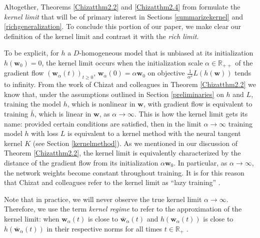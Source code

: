 \documentclass{article}
\begin{document}
Altogether, Theorems \ref{Chizatthm2.2} and \ref{Chizatthm2.4} from \cite{chizat2018lazy} formulate the \textit{kernel limit} that will be of primary interest in Sections \ref{summarizekernel} and \ref{richgeneralization}. To conclude this portion of our paper, we make clear our definition of the kernel limit and contrast it with the \textit{rich limit}. 

To be explicit, for $h$ a $D$-homogeneous model that is unbiased at its initialization $h(\boldsymbol{w}_0) = 0$, the kernel limit occurs when the initialization scale $\alpha \in \mathbb{R}_{++}$ of the gradient flow $(\boldsymbol{w}_{\alpha}(t))_{t \geq 0}$, $\boldsymbol{w}_{\alpha}(0) = \alpha \boldsymbol{w}_0$ on objective $\frac{1}{\alpha^2}L(h(\boldsymbol{w}))$ tends to infinity. From the work of Chizat and colleagues in Theorem \ref{Chizatthm2.2} we know that, under the assumptions outlined in Section \ref{preliminaries} on $h$ and $L$, training the  model $h$, which is nonlinear in $\boldsymbol{w}$, with gradient flow is equivalent to training $\bar{h}$, which is linear in $\boldsymbol{w}$, as $\alpha \rightarrow \infty$. This is how the kernel limit gets its name: provided certain conditions are satisfied, then in the limit $\alpha \rightarrow \infty$ training model $h$ with loss $L$ is equivalent to a kernel method with the neural tangent kernel $K$ (see Section \ref{kernelmethod}). As we mentioned in our discussion of Theorem \ref{Chizatthm2.2}, the kernel limit is equivalently characterized by the distance of the gradient flow from its initialization $\alpha \boldsymbol{w}_0$. In particular, as $\alpha \rightarrow \infty$, the network weights become constant throughout training. It is for this reason that Chizat and colleagues refer to the kernel limit as \enquote{lazy training} \cite{chizat2018lazy}. 

Note that in practice, we will never observe the true kernel limit $\alpha \rightarrow \infty$. Therefore, we use the term \textit{kernel regime} to refer to the approximation of the kernel limit: when $\boldsymbol{w}_{\alpha}(t)$ is close to $\boldsymbol{\bar{w}}_{\alpha}(t)$ and $h(\boldsymbol{w}_{\alpha}(t))$ is close to $h(\boldsymbol{\bar{w}}_{\alpha}(t))$ in their respective norms for all times $t \in \mathbb{R}_+$ \cite{woodworth2020kernel}.
\end{document}
